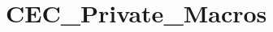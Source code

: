 \hypertarget{group___c_e_c___private___macros}{\section{C\-E\-C\-\_\-\-Private\-\_\-\-Macros}
\label{group___c_e_c___private___macros}
}
